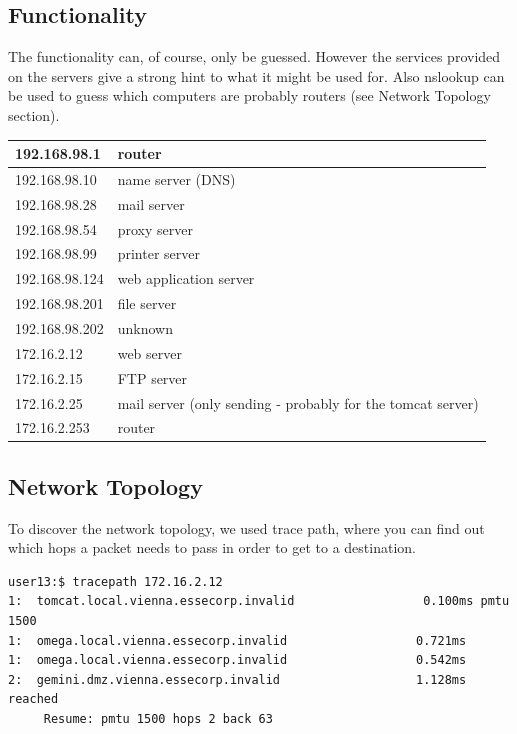 \documentclass[12pt,a4paper,titlepage,oneside]{scrartcl}
\begin{document}
\subsection{Functionality}
The functionality can, of course, only be guessed. However the services provided on the servers give a strong hint to what it might be used for. Also nslookup can be used to guess which computers are probably routers (see Network Topology section).
 
\begin{tabular}{| l | l |}
\hline
192.168.98.1 & router \\ \hline
192.168.98.10 & name server (DNS) \\ \hline
192.168.98.28 & mail server \\ \hline
192.168.98.54 & proxy server \\ \hline
192.168.98.99 & printer server \\ \hline
192.168.98.124 & web application server \\ \hline
192.168.98.201 & file server \\ \hline
192.168.98.202 & unknown \\ \hline
172.16.2.12 & web server \\ \hline
172.16.2.15 & FTP server \\ \hline
172.16.2.25 & mail server (only sending - probably for the tomcat server) \\ \hline
172.16.2.253 & router \\ \hline
\end{tabular}

\subsection{Network Topology}
To discover the network topology, we used trace path, where you can find out which hops a packet needs to pass in order to get to a destination.

\begin{lstlisting}[style=simple]
user13:$ tracepath 172.16.2.12
1:  tomcat.local.vienna.essecorp.invalid                  0.100ms pmtu 1500
1:  omega.local.vienna.essecorp.invalid                  0.721ms 
1:  omega.local.vienna.essecorp.invalid                  0.542ms 
2:  gemini.dmz.vienna.essecorp.invalid                   1.128ms reached
     Resume: pmtu 1500 hops 2 back 63 
\end{lstlisting}
\end{document}
